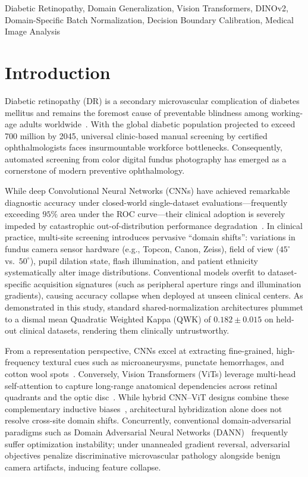 \documentclass[conference]{IEEEtran}
\begin{document}
\begin{IEEEkeywords}
Diabetic Retinopathy, Domain Generalization, Vision Transformers, DINOv2, Domain-Specific Batch Normalization, Decision Boundary Calibration, Medical Image Analysis
\end{IEEEkeywords}

\section{Introduction}
Diabetic retinopathy (DR) is a secondary microvascular complication of diabetes mellitus and remains the foremost cause of preventable blindness among working-age adults worldwide~\cite{gulshan2016development, ting2017development, abramoff2018pivotal}. With the global diabetic population projected to exceed 700 million by 2045, universal clinic-based manual screening by certified ophthalmologists faces insurmountable workforce bottlenecks. Consequently, automated screening from color digital fundus photography has emerged as a cornerstone of modern preventive ophthalmology.

While deep Convolutional Neural Networks (CNNs) have achieved remarkable diagnostic accuracy under closed-world single-dataset evaluations---frequently exceeding $95\%$ area under the ROC curve---their clinical adoption is severely impeded by catastrophic out-of-distribution performance degradation~\cite{li2018domain, wang2022domain}. In clinical practice, multi-site screening introduces pervasive ``domain shifts'': variations in fundus camera sensor hardware (e.g., Topcon, Canon, Zeiss), field of view ($45^\circ$ vs.\ $50^\circ$), pupil dilation state, flash illumination, and patient ethnicity systematically alter image distributions. Conventional models overfit to dataset-specific acquisition signatures (such as peripheral aperture rings and illumination gradients), causing accuracy collapse when deployed at unseen clinical centers. As demonstrated in this study, standard shared-normalization architectures plummet to a dismal mean Quadratic Weighted Kappa (QWK) of $0.182 \pm 0.015$ on held-out clinical datasets, rendering them clinically untrustworthy.

From a representation perspective, CNNs excel at extracting fine-grained, high-frequency textural cues such as microaneurysms, punctate hemorrhages, and cotton wool spots~\cite{tan2019efficientnet, zhang2022gdrnet}. Conversely, Vision Transformers (ViTs) leverage multi-head self-attention to capture long-range anatomical dependencies across retinal quadrants and the optic disc~\cite{dosovitskiy2020image, oquab2023dinov2}. While hybrid CNN--ViT designs combine these complementary inductive biases~\cite{yu2021transfuse}, architectural hybridization alone does not resolve cross-site domain shifts. Concurrently, conventional domain-adversarial paradigms such as Domain Adversarial Neural Networks (DANN)~\cite{ganin2016domain} frequently suffer optimization instability; under unannealed gradient reversal, adversarial objectives penalize discriminative microvascular pathology alongside benign camera artifacts, inducing feature collapse.
\end{document}
